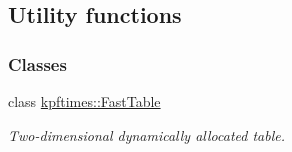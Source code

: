 \hypertarget{group__util}{
\subsection{Utility functions}
\label{group__util}
}
\subsubsection*{Classes}
\begin{DoxyCompactItemize}
\item 
class \hyperlink{classkpftimes_1_1_fast_table}{kpftimes::FastTable}
\begin{DoxyCompactList}\small\item\em Two-\/dimensional dynamically allocated table. \end{DoxyCompactList}\end{DoxyCompactItemize}
